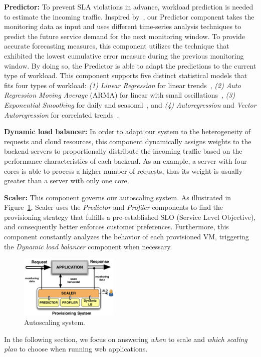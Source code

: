 \textbf{Predictor: } To prevent SLA violations in advance, workload prediction is needed to estimate the incoming traffic. Inspired by~\cite{wolski_network_1999}, our Predictor component takes the monitoring data as input and uses different time-series analysis techniques to predict the future service demand for the next monitoring window. To provide accurate forecasting measures, this component utilizes the technique that exhibited the lowest cumulative error measure during the previous monitoring window. By doing so, the Predictor is able to adapt the predictions to the current type of workload. This component supports five distinct statistical models that fits four types of workload: \emph{(1)} \emph{Linear Regression} for linear trends~\cite{muppala_regression-based_2012}, \emph{(2)} \emph{Auto Regression Moving Average} (ARMA) for linear with small oscillations~\cite{roy_efficient_2011}, \emph{(3)} \emph{Exponential Smoothing} for daily and seasonal~\cite{exponential_smoothing2010}, and \emph{(4)} \emph{Autoregression} and \emph{Vector Autoregression} for correlated trends~\cite{vector_autoregression_2006,chandra_dynamic_2003}. 




\textbf{Dynamic load balancer: } In order to adapt our system to the heterogeneity of requests and cloud resources, this component dynamically assigns weights to the backend servers to proportionally distribute the incoming traffic based on the performance characteristics of each backend. As an example, a server with four cores is able to process a higher number of requests, thus its weight is usually greater than a server with only one core.


\textbf{Scaler:} This component governs our autoscaling system. As illustrated in Figure~\ref{autoScalingSys}, Scaler uses the \emph{Predictor} and \emph{Profiler} components to find the provisioning strategy that fulfills a pre-established SLO (Service Level Objective), and consequently better enforces customer preferences. Furthermore, this component constantly analyzes the behavior of each provisioned VM, triggering the \emph{Dynamic load balancer} component when necessary.

\begin{figure}[t]
  \begin{center}
    \includegraphics[width=.75\linewidth, height=3cm]{images/monitoringSchema}
  \end{center}
\vspace{-3mm}
  \caption{Autoscaling system.}
  \label{autoScalingSys}
\end{figure}

In the following section, we focus on answering \emph{when} to scale and \emph{which scaling plan} to choose when running web applications.